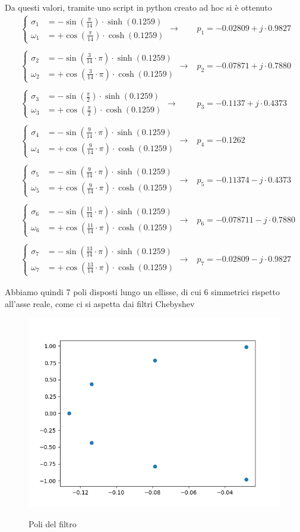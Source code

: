 \documentclass[a4paper,12pt]{report}
\newcommand{\double}[2]{\left\{ \begin{array}{cc}
		#1\\
		#2
	\end{array}
	\right.
}
\begin{document}
Da questi valori, tramite uno script in python creato ad hoc si è ottenuto
\begin{align}
&\double{\sigma_1 &= - \sin\left( \frac{\pi}{14} \right) \cdot \sinh \left( 0.1259 \right)}{\omega_1 &= + \cos\left( \frac{\pi}{14} \right) \cdot \cosh \left( 0.1259 \right)} \to &p_1 = -0.02809  +j \cdot  0.9827\\
\nonumber\\
&\double{\sigma_2 &= - \sin\left( \frac{3}{14} \cdot \pi \right) \cdot \sinh \left( 0.1259 \right)}{\omega_2 &= + \cos\left( \frac{3}{14} \cdot \pi \right) \cdot \cosh \left( 0.1259 \right)} \to &p_2 = -0.07871  +j \cdot 0.7880\\
\nonumber\\
&\double{\sigma_3 &= - \sin\left(\frac{\pi}{2} \right) \cdot \sinh \left( 0.1259 \right)}{\omega_3 &= + \cos\left( \frac{\pi}{2}\right) \cdot \cosh \left( 0.1259 \right)} \to &p_3 = -0.1137  +j \cdot 0.4373\\
\nonumber\\
&\double{\sigma_4 &= - \sin\left( \frac{9}{14} \cdot \pi \right) \cdot \sinh \left(  0.1259 \right)}{\omega_4 &= + \cos\left( \frac{9}{14} \cdot \pi \right) \cdot \cosh \left(  0.1259 \right)} \to
&p_4 = -0.1262\\
\nonumber\\
&\double{\sigma_5 &= - \sin\left( \frac{9}{14} \cdot \pi \right) \cdot \sinh \left( 0.1259 \right)}{\omega_5 &= + \cos\left( \frac{9}{14} \cdot \pi \right) \cdot \cosh \left( 0.1259 \right)} \to
&p_5 = -0.11374  -j \cdot 0.4373\\
\nonumber\\
&\double{\sigma_6 &= - \sin\left( \frac{11}{14} \cdot \pi \right) \cdot \sinh \left(0.1259 \right)}{\omega_6 &= + \cos\left( \frac{11}{14} \cdot \pi \right) \cdot \cosh \left( 0.1259 \right)} \to
&p_6 = -0.078711  -j \cdot 0.7880\\
\nonumber\\
&\double{\sigma_7 &= - \sin\left( \frac{13}{14} \cdot \pi \right) \cdot \sinh \left(0.1259 \right)}{\omega_7 &= + \cos\left( \frac{13}{14} \cdot \pi \right) \cdot \cosh \left( 0.1259 \right)} \to
&p_7 = -0.02809  -j \cdot 0.9827
\end{align}

\newpage
Abbiamo quindi 7 poli disposti lungo un ellisse, di cui 6 simmetrici rispetto all'asse reale, come ci si aspetta dai filtri Chebyshev
\begin{figure}[!htb]
	\centering
	\includegraphics[width=.4\textwidth]{n=7_epsilon=1.0.png}
	\label{lol}
	\caption{\label{kekw} \small Poli del filtro}
\end{figure}
\end{document}
